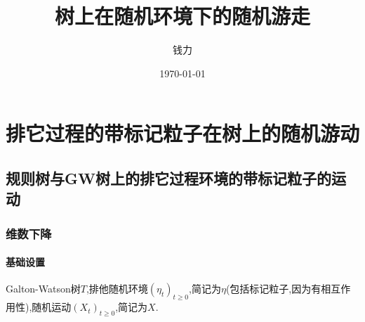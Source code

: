 \documentclass[a4paper,oneside]{ctexbook}
\begin{document}
\title{ \Huge \textbf{树上在随机环境下的随机游走} }
	
\vspace{4em}

\author{钱力}

\date{\today}

\maketitle
\thispagestyle{empty}





 



\cleardoublepage
{}
{}
\tableofcontents
\cleardoublepage

\newtheorem{thm}{定理}[chapter]
\newtheorem{que}[thm]{问题}
\newtheorem{pro}[thm]{命题}
\newtheorem{cor}[thm]{推论}
\newtheorem{defi}[thm]{定义}
\newtheorem{lem}[thm]{引理}
\newtheorem{conjec}[thm]{猜想}
\newtheorem{tri}[thm]{尝试}
\newtheorem{pf}[thm]{证明}


\chapter{排它过程的带标记粒子在树上的随机游动}

\section{规则树与GW树上的排它过程环境的带标记粒子的运动}

	


	
	\subsection{维数下降}

		\subsubsection*{基础设置}

			Galton-Watson树$T$,排他随机环境$(\eta_t)_{t \ge 0}$,简记为$\eta$(包括标记粒子,因为有相互作用性),随机运动$(X_t)_{t \ge 0}$,简记为$X$.
\end{document}
